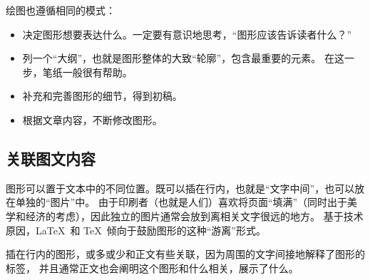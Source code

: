 绘图也遵循相同的模式：

\eohs

\begin{itemize}
\item
  决定图形想要表达什么。一定要有意识地思考，“图形应该告诉读者什么？”
\item
  列一个“大纲”，也就是图形整体的大致“轮廓”，包含最重要的元素。
  在这一步，笔纸一般很有帮助。
\item
  补充和完善图形的细节，得到初稿。
\item
  根据文章内容，不断修改图形。
\end{itemize}


\subsection{关联图文内容}

\bohs

图形可以置于文本中的不同位置。既可以插在行内，也就是“文字中间”，也可以放在单独的“图片”中。
由于印刷者（也就是人们）喜欢将页面“填满”（同时出于美学和经济的考虑），因此独立的图片通常会放到离相关文字很远的地方。
基于技术原因，\LaTeX\ 和 \TeX\ 倾向于鼓励图形的这种“游离”形式。

插在行内的图形，或多或少和正文有些关联，因为周围的文字间接地解释了图形的标签，
并且通常正文也会阐明这个图形和什么相关，展示了什么。

